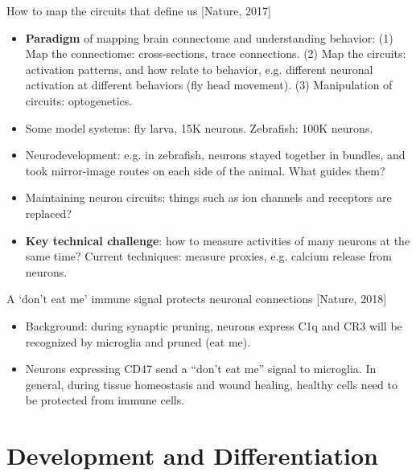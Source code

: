 \documentclass{report}
\begin{document}
How to map the circuits that define us [Nature, 2017]
\begin{itemize}
	\item \textbf{Paradigm} of mapping brain connectome and understanding behavior: (1) Map the connectiome: cross-sections, trace connections. (2) Map the circuits: activation patterns, and how relate to behavior, e.g. different neuronal activation at different behaviors (fly head movement). (3) Manipulation of circuits: optogenetics. 
	
	\item Some model systems: fly larva, 15K neurons. Zebrafish: 100K neurons. 
	
	\item Neurodevelopment: e.g. in zebrafish, neurons stayed together in bundles, and took mirror-image routes on each side of the animal. What guides them? 
	
	\item Maintaining neuron circuits: things such as ion channels and receptors are replaced? 
	
	\item \textbf{Key technical challenge}: how to measure activities of many neurons at the same time? Current techniques: measure proxies, e.g. calcium release from neurons. 
\end{itemize}

A ‘don’t eat me’ immune signal protects neuronal connections [Nature, 2018]
\begin{itemize}
	\item Background: during synaptic pruning, neurons express C1q and CR3 will be recognized by microglia and pruned (eat me). 
	
	\item Neurons expressing CD47 send a “don’t eat me” signal to microglia. In general, during tissue homeostasis and wound healing, healthy cells need to be protected from immune cells.  
\end{itemize}

\section{Development and Differentiation}
\end{document}
